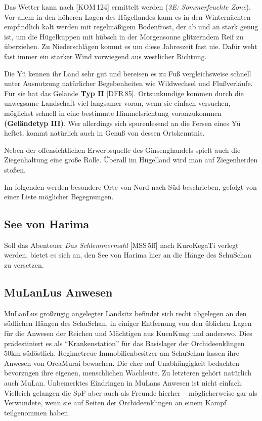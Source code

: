 \documentclass[
a4paper,
twoside,
DIV=calc,
BCOR=4mm,
fontsize=9pt,
twocolumn=on,
titlepage=on,
parskip=half
]{scrartcl}
\begin{document}
Das Wetter kann nach [KOM\,124] ermittelt werden (\emph{3E:
  Sommerfeuchte Zone}). Vor allem in den höheren Lagen des Hügellandes
kann es in den Winternächten empfindlich kalt werden mit regelmäßigem
Bodenfrost, der ab und an stark genug ist, um die Hügelkuppen mit
hübsch in der Morgensonne glitzerndem Reif zu überziehen. Zu
Niederschlägen kommt es um diese Jahreszeit fast nie. Dafür weht fast
immer ein starker Wind vorwiegend aus westlicher Richtung.

Die Yü kennen ihr Land sehr gut und bereisen es zu Fuß vergleichsweise
schnell unter Ausnutzung natürlicher Begebenheiten wie Wildwechsel und
Flußverläufe. Für sie hat das Gelände \textbf{Typ II}
[DFR\,85]. Ortsunkundige kommen durch die unwegsame Landschaft viel
langsamer voran, wenn sie einfach versuchen, möglichst schnell in eine
bestimmte Himmelsrichtung voranzukommen \textbf{(Geländetyp III)}. Wer
allerdings sich spurenlesend an die Fersen eines Yü heftet, kommt
natürlich auch in Genuß von dessen Ortskenntnis.

Neben der offensichtlichen Erwerbsquelle des Ginsenghandels spielt
auch die Ziegenhaltung eine große Rolle. Überall im Hügelland wird
man auf Ziegenherden stoßen.

Im folgenden werden besondere Orte von Nord nach Süd beschrieben,
gefolgt von einer Liste möglicher Begegnungen.

\subsection{See von Harima}

Soll das Abenteuer \emph{Das Schlemmermahl} [MSS\,5ff] nach KuroKegaTi
verlegt werden, bietet es sich an, den See von Harima hier an die
Hänge des SchuSchan zu versetzen.

\subsection{MuLanLus Anwesen}
\label{mulanlus-anwesen}

MuLanLus großzügig angelegter Landsitz befindet sich recht abgelegen
an den südlichen Hängen des SchuSchan, in einiger Entfernung von den
üblichen Lagen für die Anwesen der Reichen und Mächtigen aus KuenKung
und anderswo. Dies prädestiniert es als "`Krankenstation"' für das
Basislager der Orchideenklingen 50km südöstlich. Regimetreue
Immobilienbesitzer am SchuSchan lassen ihre Anwesen von OrcaMurai
bewachen. Die eher auf Unabhängigkeit bedachten bevorzugen ihre
eigenen, menschlichen Wachleute. Zu letzteren gehört natürlich auch
MuLan. Unbemerktes Eindringen in MuLans Anwesen ist nicht
einfach. Vielleich gelangen die SpF aber auch als Freunde hierher --
möglicherweise gar als Verwundete, wenn sie auf Seiten der
Orchideenklingen an einem Kampf teilgenommen haben.
\end{document}
